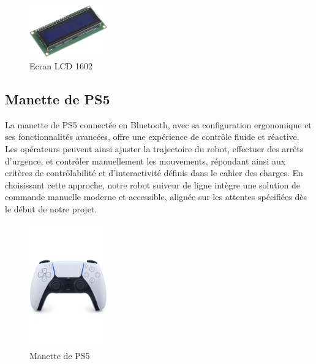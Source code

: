 \begin{figure}[h]
    \centering
    \includegraphics[width=0.3\textwidth]{images/LCD.jpg}
    \caption{Ecran LCD 1602}
    \label{fig:LCD1602}
\end{figure}

\subsection{Manette de PS5}
La manette de PS5 connectée en Bluetooth, avec sa configuration ergonomique et ses fonctionnalités avancées, offre une expérience de contrôle fluide et réactive. Les opérateurs peuvent ainsi ajuster la trajectoire du robot, effectuer des arrêts d'urgence, et contrôler manuellement les mouvements, répondant ainsi aux critères de contrôlabilité et d'interactivité définis dans le cahier des charges. En choisissant cette approche, notre robot suiveur de ligne intègre une solution de commande manuelle moderne et accessible, alignée sur les attentes spécifiées dès le début de notre projet.

\begin{figure}[h]
    \centering
    \includegraphics[width=0.3\textwidth]{images/manette_PS5.jpg}
    \caption{Manette de PS5}
    \label{fig:Manette de PS5}
\end{figure}

\newpage